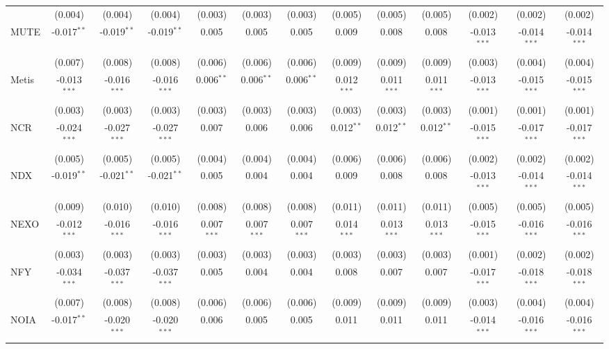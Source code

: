 \begin{table}[!htbp]
\begin{tabular}{@{\extracolsep{5pt}}lcccccccccccc}
  & (0.004) & (0.004) & (0.004) & (0.003) & (0.003) & (0.003) & (0.005) & (0.005) & (0.005) & (0.002) & (0.002) & (0.002) \\
 MUTE & -0.017$^{**}$ & -0.019$^{**}$ & -0.019$^{**}$ & 0.005$^{}$ & 0.005$^{}$ & 0.005$^{}$ & 0.009$^{}$ & 0.008$^{}$ & 0.008$^{}$ & -0.013$^{***}$ & -0.014$^{***}$ & -0.014$^{***}$ \\
  & (0.007) & (0.008) & (0.008) & (0.006) & (0.006) & (0.006) & (0.009) & (0.009) & (0.009) & (0.003) & (0.004) & (0.004) \\
 Metis & -0.013$^{***}$ & -0.016$^{***}$ & -0.016$^{***}$ & 0.006$^{**}$ & 0.006$^{**}$ & 0.006$^{**}$ & 0.012$^{***}$ & 0.011$^{***}$ & 0.011$^{***}$ & -0.013$^{***}$ & -0.015$^{***}$ & -0.015$^{***}$ \\
  & (0.003) & (0.003) & (0.003) & (0.003) & (0.003) & (0.003) & (0.003) & (0.003) & (0.003) & (0.001) & (0.001) & (0.001) \\
 NCR & -0.024$^{***}$ & -0.027$^{***}$ & -0.027$^{***}$ & 0.007$^{}$ & 0.006$^{}$ & 0.006$^{}$ & 0.012$^{**}$ & 0.012$^{**}$ & 0.012$^{**}$ & -0.015$^{***}$ & -0.017$^{***}$ & -0.017$^{***}$ \\
  & (0.005) & (0.005) & (0.005) & (0.004) & (0.004) & (0.004) & (0.006) & (0.006) & (0.006) & (0.002) & (0.002) & (0.002) \\
 NDX & -0.019$^{**}$ & -0.021$^{**}$ & -0.021$^{**}$ & 0.005$^{}$ & 0.004$^{}$ & 0.004$^{}$ & 0.009$^{}$ & 0.008$^{}$ & 0.008$^{}$ & -0.013$^{***}$ & -0.014$^{***}$ & -0.014$^{***}$ \\
  & (0.009) & (0.010) & (0.010) & (0.008) & (0.008) & (0.008) & (0.011) & (0.011) & (0.011) & (0.005) & (0.005) & (0.005) \\
 NEXO & -0.012$^{***}$ & -0.016$^{***}$ & -0.016$^{***}$ & 0.007$^{***}$ & 0.007$^{***}$ & 0.007$^{***}$ & 0.014$^{***}$ & 0.013$^{***}$ & 0.013$^{***}$ & -0.015$^{***}$ & -0.016$^{***}$ & -0.016$^{***}$ \\
  & (0.003) & (0.003) & (0.003) & (0.003) & (0.003) & (0.003) & (0.003) & (0.003) & (0.003) & (0.001) & (0.002) & (0.002) \\
 NFY & -0.034$^{***}$ & -0.037$^{***}$ & -0.037$^{***}$ & 0.005$^{}$ & 0.004$^{}$ & 0.004$^{}$ & 0.008$^{}$ & 0.007$^{}$ & 0.007$^{}$ & -0.017$^{***}$ & -0.018$^{***}$ & -0.018$^{***}$ \\
  & (0.007) & (0.008) & (0.008) & (0.006) & (0.006) & (0.006) & (0.009) & (0.009) & (0.009) & (0.003) & (0.004) & (0.004) \\
 NOIA & -0.017$^{**}$ & -0.020$^{***}$ & -0.020$^{***}$ & 0.006$^{}$ & 0.005$^{}$ & 0.005$^{}$ & 0.011$^{}$ & 0.011$^{}$ & 0.011$^{}$ & -0.014$^{***}$ & -0.016$^{***}$ & -0.016$^{***}$ \\

\end{tabular}
\end{table}
